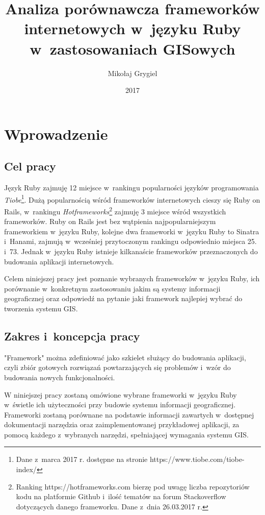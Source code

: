 \documentclass[printmode]{mgr}
\date{2017}
\title{Analiza porównawcza frameworków internetowych w~języku Ruby w~zastosowaniach GISowych}
\author{Mikołaj Grygiel}
\begin{document}


\maketitle

\tableofcontents

\chapter{Wprowadzenie}
\section{Cel pracy}
Język Ruby zajmuję 12 miejsce w~rankingu popularności języków programowania \emph{Tiobe}\footnote{Dane z~marca 2017 r. dostępne na stronie https://www.tiobe.com/tiobe-index/}. Dużą popularnością wśród frameworków internetowych cieszy się Ruby on Rails, w~rankingu \emph{Hotframeworks}\footnote{Ranking https://hotframeworks.com bierzę pod uwagę liczba repozytoriów kodu na platformie Github i~ilość tematów na forum Stackoverflow dotyczących danego frameworku. Dane z~dnia 26.03.2017 r.} zajmuję 3 miejsce wśród wszystkich frameworków. Ruby on Rails jest bez wątpienia najpopularniejszym frameworkiem w~języku Ruby, kolejne dwa frameworki w~języku Ruby to Sinatra i~Hanami, zajmują w~wcześniej przytoczonym rankingu odpowiednio miejsca 25. i~73. Jednak w~języku Ruby istnieje kilkanaście frameworków przeznaczonych do budowania aplikacji internetowych.

Celem niniejszej pracy jest poznanie wybranych frameworków w~języku Ruby, ich porównanie w~konkretnym zastosowaniu jakim są systemy informacji geograficznej oraz odpowiedź na pytanie jaki framework najlepiej wybrać do tworzenia systemu GIS.

\section{Zakres i~koncepcja pracy}
"Framework" można zdefiniować jako szkielet służący do budowania aplikacji, czyli zbiór gotowych rozwiązań powtarzających się problemów i~wzór do budowania nowych funkcjonalności. \cite{framework}

W niniejszej pracy zostaną omówione wybrane frameworki w~języku Ruby w~świetle ich użyteczności przy budowie systemu informacji geograficznej. Frameworki zostaną porównane na podstawie informacji zawartych w~dostępnej dokumentacji narzędzia oraz zaimplementowanej przykładowej aplikacji, za pomocą każdego z~wybranych narzędzi, spełniającej wymagania systemu GIS.
\end{document}
